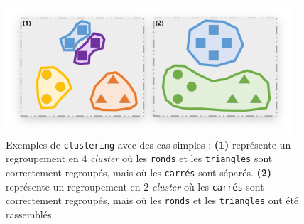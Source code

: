 		\newpage
		\begin{figure}[H]
			\centering
			\includegraphics[width=0.95\textwidth]{figures/annexe-vmeasure-cas-simples}
			\caption{
				Exemples de \texttt{clustering} avec des cas simples :
				\textbf{(1)} représente un regroupement en $4$ \textit{cluster} où les \texttt{ronds} et les \texttt{triangles} sont correctement regroupés, mais où les \texttt{carrés} sont séparés.
				\textbf{(2)} représente un regroupement en $2$ \textit{cluster} où les \texttt{carrés} sont correctement regroupés, mais où les \texttt{ronds} et les \texttt{triangles} ont été rassemblés.
			}
			\label{figure:D.2-ANNEXE-EVALUATION-CLUSTERING-EXEMPLE-VMEASURE-2-CAS-SIMPLES}
		\end{figure}
		
